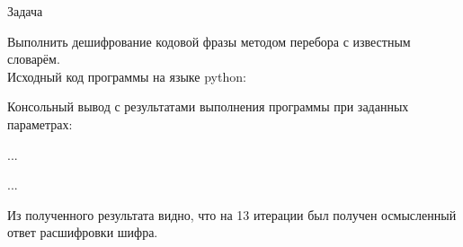 \begin{center}
    Задача
\end{center}
Выполнить дешифрование кодовой фразы методом перебора с известным словарём.\\

Исходный код программы на языке python:



Консольный вывод с результатами выполнения программы при заданных параметрах:


...

...


Из полученного результата видно, что на 13 итерации был получен осмысленный ответ расшифровки шифра.

\vspace{28pt}
